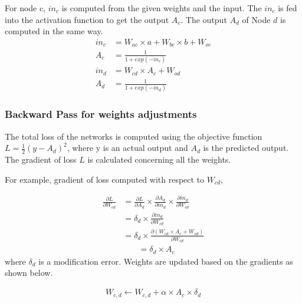\documentclass[12pt]{report} %
\begin{document}
For node c, $in_{c}$ is computed from the given weights and the input. The $in_{c}$ is fed into the activation function to get the output $A_{c}$. The output $A_{d}$ of Node $d$ is computed in the same way.
\begin{align} 
in_{c}    & = W_{ac} \times a + W_{bc} \times b + W_{oc} \\
A_{c} & = \frac{1}{1+exp(-in_{c})} \\
in_{d}    & = W_{cd} \times A_c + W_{od} \\
A_{d} & = \frac{1}{1+exp(-in_{d})} 
\end{align}

%

\subsubsection*{Backward Pass for weights adjustments}
The total loss of the networks is computed using the objective function $L = \frac{1}{2} (y - A_{d})^{2}$, where y is an actual output and $A_{d}$ is the predicted output. The gradient of loss $L$ is calculated concerning all the weights.

For example, gradient of loss computed with respect to $W_{cd}$, 

\begin{align*} 
\frac{\partial L}{\partial W_{cd}} & = \frac{\partial L}{\partial A_{d}} \times \frac{\partial A_{d}}{\partial in_{d}} \times \frac{\partial in_{d}}{\partial W_{cd}}    \\
& = \delta_{d} \times  \frac{\partial in_{d}}{\partial W_{cd}}  \\
& = \delta_{d} \times  \frac{\partial ( W_{cd} \times A_c + W_{od})}{\partial W_{cd}}
\end{align*}
\begin{align}
& = \delta_{d} \times  A_c
\end{align}  
where $\delta_{d}$ is a modification error. Weights are updated based on the gradients as shown below.

\begin{align} 
W_{c,d} \leftarrow W_{c,d} + \alpha \times A_{c} \times \delta_{d}
\end{align}
\end{document}
